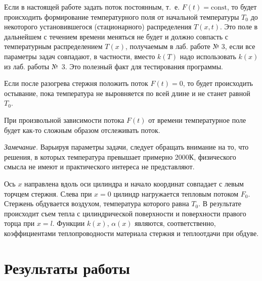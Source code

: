 \documentclass[a4paper,oneside,12pt]{extreport}
\begin{document}
Если в настоящей работе задать поток постоянным, т.~е. $F(t)=\mathrm{const}$, то будет происходить формирование температурного поля от начальной температуры $T_0$ до некоторого установившегося (стационарного) распределения $T(x, t)$.
Это поле в дальнейшем с течением времени меняться не будет и должно совпасть с температурным распределением $T(x)$, получаемым в лаб. работе № 3, если все параметры задач совпадают, в частности, вместо $k(T)$ надо использовать $k(x)$ из лаб. работы №~3.
Это полезный факт для тестирования программы.

Если после разогрева стержня положить поток $F(t)=0$, то будет происходить остывание, пока температура не выровняется по всей длине и не станет равной $T_0$.

При произвольной зависимости потока $F(t)$ от времени температурное поле будет как-то сложным образом отслеживать поток.

\textit{Замечание.} Варьируя параметры задачи, следует обращать внимание на то, что решения, в которых температура превышает примерно 2000К, физического смысла не имеют и практического интереса не представляют.

Ось $x$ направлена вдоль оси цилиндра и начало координат совпадает с левым торчцем стержня.
Слева при $x=0$ цилиндр нагружается тепловым потоком $F_0$.
Стержень обдувается воздухом, температура которого равна $T_0$.
В результате происходит съем тепла с цилиндрической поверхности и поверхности правого торца при $x=l$.
Функции $k(x)$, $\alpha(x)$ являются, соответственно, коэффициентами теплопроводности материала стержня и теплоотдачи при обдуве.

\section*{Результаты работы}
\end{document}

